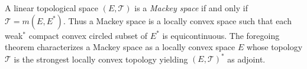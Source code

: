 A linear topological space $(E,\mathcal{T})$ is a \textit{Mackey space} if and only if $\mathcal{T} = m(E,E^*)$. Thus a Mackey space is a locally convex space such that each weak$^*$ compact convex circled subset of $E^*$ is equicontinuous. The foregoing theorem characterizes a Mackey space as a locally convex space $E$ whose topology $\mathcal{T}$ is the strongest locally convex topology yielding $(E,\mathcal{T})^*$ as adjoint.
